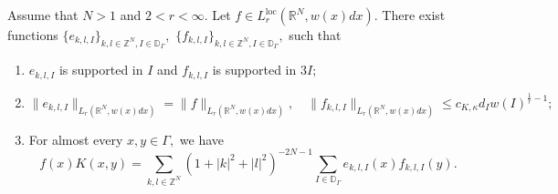 \documentclass[12pt]{amsart}
\begin{document}
\begin{lemma}\label{lem:rank-one-decomposition-Dunkl} Assume that $N>1$ and $2<r<\infty.$ Let $f\in L_r^{\mathrm{loc}}(\mathbb{R}^N,w(x)dx).$ There exist functions
$
\{e_{k,l,I}\}_{k,l\in\mathbb{Z}^N,I\in\mathbb{D}_{\Gamma}},$ $
\{f_{k,l,I}\}_{k,l\in\mathbb{Z}^N,I\in\mathbb{D}_{\Gamma}},$
such that
\begin{enumerate}
\item $e_{k,l,I}$ is supported in $I$ and $f_{k,l,I}$ is supported in $3I;$
\item
$$\|e_{k,l,I}\|_{L_r(\mathbb{R}^N,w(x)dx)}=\|f\|_{L_r(\mathbb{R}^N,w(x)dx)},\quad \|f_{k,l,I}\|_{L_r(\mathbb{R}^N,w(x)dx)}\leq c_{K,\kappa}d_Iw(I)^{\frac1r-1};$$
\item For almost every $x,y\in\Gamma,$ we have
\begin{equation}\label{eq:Dunkl-kernel-rank-one-new}
f(x)K(x,y)=\sum_{k,l\in\mathbb{Z}^N}(1+|k|^2+|l|^2)^{-2N-1}\sum_{I\in\mathbb{D}_{\Gamma}}e_{k,l,I}(x)f_{k,l,I}(y).
\end{equation}
\end{enumerate}
\end{lemma}
\end{document}
